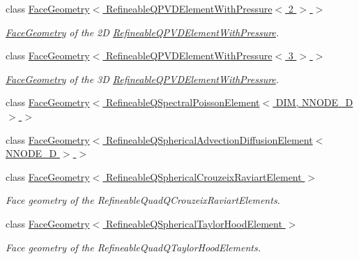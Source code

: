 \begin{DoxyCompactItemize}
class \hyperlink{classoomph_1_1FaceGeometry_3_01RefineableQPVDElementWithPressure_3_012_01_4_01_4}{Face\+Geometry$<$ Refineable\+Q\+P\+V\+D\+Element\+With\+Pressure$<$ 2 $>$ $>$}
\begin{DoxyCompactList}\small\item\em \hyperlink{classoomph_1_1FaceGeometry}{Face\+Geometry} of the 2D \hyperlink{classoomph_1_1RefineableQPVDElementWithPressure}{Refineable\+Q\+P\+V\+D\+Element\+With\+Pressure}. \end{DoxyCompactList}\item 
class \hyperlink{classoomph_1_1FaceGeometry_3_01RefineableQPVDElementWithPressure_3_013_01_4_01_4}{Face\+Geometry$<$ Refineable\+Q\+P\+V\+D\+Element\+With\+Pressure$<$ 3 $>$ $>$}
\begin{DoxyCompactList}\small\item\em \hyperlink{classoomph_1_1FaceGeometry}{Face\+Geometry} of the 3D \hyperlink{classoomph_1_1RefineableQPVDElementWithPressure}{Refineable\+Q\+P\+V\+D\+Element\+With\+Pressure}. \end{DoxyCompactList}\item 
class \hyperlink{classoomph_1_1FaceGeometry_3_01RefineableQSpectralPoissonElement_3_01DIM_00_01NNODE__1D_01_4_01_4}{Face\+Geometry$<$ Refineable\+Q\+Spectral\+Poisson\+Element$<$ D\+I\+M, N\+N\+O\+D\+E\+\_\+D $>$ $>$}
\item 
class \hyperlink{classoomph_1_1FaceGeometry_3_01RefineableQSphericalAdvectionDiffusionElement_3_01NNODE__1D_01_4_01_4}{Face\+Geometry$<$ Refineable\+Q\+Spherical\+Advection\+Diffusion\+Element$<$ N\+N\+O\+D\+E\+\_\+D $>$ $>$}
\item 
class \hyperlink{classoomph_1_1FaceGeometry_3_01RefineableQSphericalCrouzeixRaviartElement_01_4}{Face\+Geometry$<$ Refineable\+Q\+Spherical\+Crouzeix\+Raviart\+Element $>$}
\begin{DoxyCompactList}\small\item\em Face geometry of the Refineable\+Quad\+Q\+Crouzeix\+Raviart\+Elements. \end{DoxyCompactList}\item 
class \hyperlink{classoomph_1_1FaceGeometry_3_01RefineableQSphericalTaylorHoodElement_01_4}{Face\+Geometry$<$ Refineable\+Q\+Spherical\+Taylor\+Hood\+Element $>$}
\begin{DoxyCompactList}\small\item\em Face geometry of the Refineable\+Quad\+Q\+Taylor\+Hood\+Elements. \end{DoxyCompactList}\item 

\end{DoxyCompactItemize}
